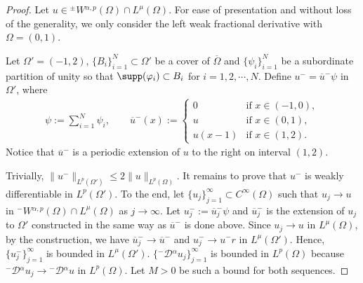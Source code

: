 \documentclass[leqno,final]{siamltex}
\numberwithin{equation}{section}
\renewcommand{\(}{\bigl(}
\renewcommand{\)}{\bigr)}
\begin{document}
    \begin{proof}
        Let $u \in {^{\pm}}{W}{^{\alpha,p}}(\Omega) \cap L^{\mu}(\Omega)$. For ease of
        presentation and without loss of the generality,  we only consider the left weak fractional  derivative  with $\Omega = (0,1)$.
        
         Let $\Omega' = (-1 ,2)$, $\{B_{i}\}_{i=1}^{N} \subset \Omega'$ be a cover of 
        $\overline{\Omega}$ and $\{\psi_i\}_{i=1}^{N}$ be a subordinate partition of unity so that 
        $\supp(\varphi_i) \subset B_i$ for $i=1,2,\cdots, N$. 
         Define $u^{-} = \overline{u}^{-} \psi$ in $\Omega'$, where 
        \begin{align*}
           \psi:=\sum_{i=1}^{N}\psi_{i}, \qquad 
            \overline{u}^{-}(x):= \begin{cases}
                0 &\text{if }  x \in (-1,0), \\
                u &\text{if } x \in (0,1) ,\\ 
                u(x-1) &\text{if } x \in (1,2).
            \end{cases}
        \end{align*}
       Notice that $\overline{u}^{-}$ is a periodic extension of $u$ to the right on interval $(1,2)$.  
        
        Trivially, $\|u^{-}\|_{L^{p}(\Omega')} \leq 2 \|u\|_{L^p(\Omega)}$. It remains to prove that $u^{-}$ is weakly differentiable in $L^{p}(\Omega')$. To the end, let $\{u_j\}_{j= 1}^{\infty} \subset C^{\infty}(\Omega)$ such that $u_j  \rightarrow u$ in ${^{-}}{W}{^{\alpha,p}}(\Omega) \cap L^{\mu}(\Omega)$ as
        $j\to \infty$. Let $u_j^-:=\overline{u}^{-}_{j} \psi$ and $\overline{u}^{-}_{j} $ is the extension of $u_j$ to $\Omega'$
        constructed in the same way  as $\overline{u}^{-}$ is done above.  
         Since $u_j\to u$ in $L^\mu(\Omega)$, by the construction, we  have $\overline{u}^{-}_j \to \overline{u}^{-}$ and  
         $u_j^- \to  u^-r$ in $L^{\mu}(\Omega')$. 
         Hence, $\{u_j^-\}_
         {j=1}^{\infty}$ is bounded in $L^{\mu}(\Omega')$. $\{{^{-}}{\mathcal{D}}{^{\alpha}}u_j\}_{j=1}^{\infty}$ is bounded in $L^{p}(\Omega)$ because  ${^{-}}{\mathcal{D}}{^{\alpha}}u_j\to {^{-}}{\mathcal{D}}{^{\alpha}}u$ in $L^{p}(\Omega)$.  Let $M >0$ be such a bound for both sequences. 
         

\end{proof}
\end{document}
